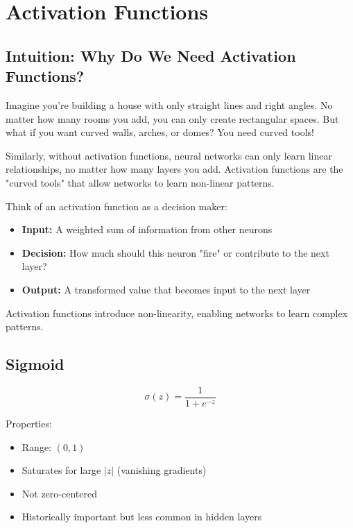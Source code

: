 
\section{Activation Functions }
\label{sec:activation-functions}

\subsection{Intuition: Why Do We Need Activation Functions?}

Imagine you're building a house with only straight lines and right angles. No matter how many rooms you add, you can only create rectangular spaces. But what if you want curved walls, arches, or domes? You need curved tools!

Similarly, without activation functions, neural networks can only learn linear relationships, no matter how many layers you add. Activation functions are the "curved tools" that allow networks to learn non-linear patterns.

Think of an activation function as a decision maker:
\begin{itemize}
    \item \textbf{Input:} A weighted sum of information from other neurons
    \item \textbf{Decision:} How much should this neuron "fire" or contribute to the next layer?
    \item \textbf{Output:} A transformed value that becomes input to the next layer
\end{itemize}

Activation functions introduce non-linearity, enabling networks to learn complex patterns.

\subsection{Sigmoid}

\begin{equation}
\sigma(z) = \frac{1}{1 + e^{-z}}
\end{equation}

Properties:
\begin{itemize}
    \item Range: $(0, 1)$
    \item Saturates for large $|z|$ (vanishing gradients)
    \item Not zero-centered
    \item Historically important but less common in hidden layers
\end{itemize}

